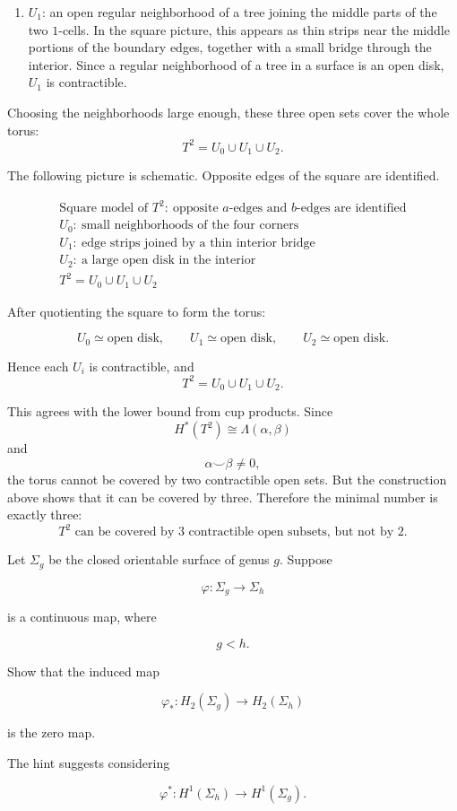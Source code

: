 \begin{solution}
\begin{enumerate}
	\item \(U_1\): an open regular neighborhood of a tree joining the middle parts of the two \(1\)-cells. In the square picture, this appears as thin strips near the middle portions of the boundary edges, together with a small bridge through the interior. Since a regular neighborhood of a tree in a surface is an open disk, \(U_1\) is contractible.
\end{enumerate}

Choosing the neighborhoods large enough, these three open sets cover the whole torus:
\[
T^2=U_0\cup U_1\cup U_2.
\]

The following picture is schematic. Opposite edges of the square are identified.



\[
\boxed{
\begin{array}{c}
\text{Square model of }T^2:\ \text{opposite }a\text{-edges and }b\text{-edges are identified}\\[1mm]
U_0:\ \text{small neighborhoods of the four corners}\\
U_1:\ \text{edge strips joined by a thin interior bridge}\\
U_2:\ \text{a large open disk in the interior}\\[1mm]
T^2=U_0\cup U_1\cup U_2
\end{array}}
\]



After quotienting the square to form the torus:

\[
\boxed{
	U_0\simeq \text{open disk},
	\qquad
	U_1\simeq \text{open disk},
	\qquad
	U_2\simeq \text{open disk}.
}
\]

Hence each \(U_i\) is contractible, and
\[
\boxed{
	T^2=U_0\cup U_1\cup U_2.
}
\]

This agrees with the lower bound from cup products. Since
\[
H^*(T^2)\cong \Lambda(\alpha,\beta)
\]
and
\[
\alpha\smile\beta\neq 0,
\]
the torus cannot be covered by two contractible open sets. But the construction above shows that it can be covered by three. Therefore the minimal number is exactly three:
\[
\boxed{
	T^2 \text{ can be covered by } 3 \text{ contractible open subsets, but not by } 2.
}
\]
\end{solution}

\begin{problem}
Let \(\Sigma_g\) be the closed orientable surface of genus \(g\). Suppose

\[
\varphi:\Sigma_g\longrightarrow \Sigma_h
\]

is a continuous map, where

\[
g<h.
\]

Show that the induced map

\[
\varphi_*:H_2(\Sigma_g)\longrightarrow H_2(\Sigma_h)
\]

is the zero map.

The hint suggests considering

\[
\varphi^*:H^1(\Sigma_h)\longrightarrow H^1(\Sigma_g).
\]
\end{problem}

